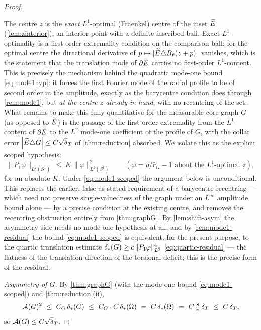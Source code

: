 \begin{proof}
\begin{remark}%
\label{gap:barycentre}
The centre $z$ is the \emph{exact} $L^1$-optimal (Fraenkel) centre of the
inset $\widetilde{E}$ (\cref{lem:zinterior}), an interior point with a definite
inscribed ball. Exact $L^1$-optimality is a first-order extremality condition
on the comparison ball: for the optimal centre the directional derivative of
$p\mapsto|\widetilde{E}\triangle B_{\hat r}(z+p)|$ vanishes, which is the statement
that the translation mode of $\partial\widetilde{E}$ carries no first-order
$L^1$-content. This is precisely the mechanism behind the quadratic mode-one
bound \eqref{eq:mode1hyp}: it forces the first Fourier mode of the radial
profile to be of second order in the amplitude, exactly as the barycentre
condition does through \cref{rem:mode1}, but \emph{at the centre $z$ already
in hand}, with no recentring of the set. What remains to make this fully
quantitative for the measurable core graph $G$ (as opposed to $\widetilde{E}$) is the
passage of the first-order extremality from the $L^1$-content of $\partial
\widetilde{E}$ to the $L^2$ mode-one coefficient of the profile of $G$, with the
collar error $\abs{\Etil\triangle G}\le C\sqrt\dT$ of \cref{thm:reduction}
absorbed. We isolate this as the explicit scoped hypothesis:
\begin{equation}\label{eq:mode1-scoped}
   \|P_1\varphi\|_{L^2(S^1)}\ \le\ K\,\|\varphi\|_{L^2(S^1)}^2
   \qquad(\varphi=\rho/\hat r_G-1\text{ about the }L^1\text{-optimal }z),
\end{equation}
for an absolute $K$. Under \eqref{eq:mode1-scoped} the argument below is
unconditional. This replaces the earlier, false-as-stated requirement of a
barycentre recentring --- which need not preserve single-valuedness of the
graph under an $L^\infty$ amplitude bound alone --- by a precise condition at
the existing centre, and removes the recentring obstruction entirely from
\cref{thm:graphG}. By \cref{lem:shift-asym} the asymmetry side needs no
mode-one hypothesis at all, and by \cref{rem:mode1-residual} the bound
\eqref{eq:mode1-scoped} is equivalent, for the present purpose, to the quartic
translation estimate $\delta_{*}(G)\ge c\,\|P_1\varphi\|_{L^2}^4$
\eqref{eq:quartic-residual} --- the flatness of the translation direction of
the torsional deficit; this is the precise form of the residual.
\end{remark}

\emph{Asymmetry of $G$.} By \cref{thm:graphG} (with the mode-one bound
\eqref{eq:mode1-scoped}) and \cref{thm:reduction}(ii),
\begin{equation}\label{eq:m-AG}
   \mathcal{A}(G)^2\ \le\ C_G\,\delta_{*}(G)\ \le\ C_G\cdot C\,\delta_{*}(\Omega)
   \ =\ C\,\delta_{*}(\Omega)\ =\ C\,\tfrac8\pi\,\delta_T\ \le\ C\,\delta_T,
\end{equation}
so $\AF(G)\le C\sqrt\dT$.


\end{proof}
